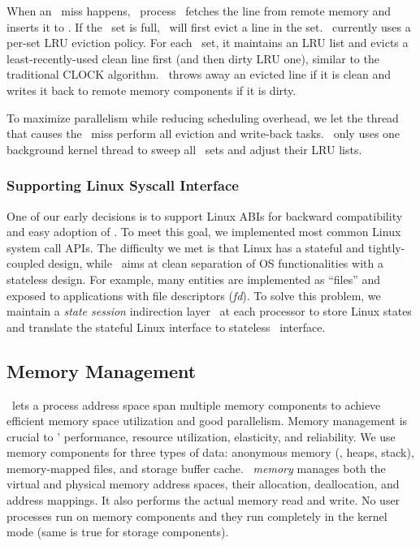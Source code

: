 \documentclass[10pt,times,twocolumn]{z2-article}
\begin{document}
{{{{{{{When an \excache\ miss happens, 
\lego\ process \microos\ fetches the line from remote memory and inserts it to \excache.
If the \excache\ set is full, \lego\ will first evict a line in the set.
\lego\ currently uses a per-set LRU eviction policy.
For each \excache\ set, it maintains an LRU list and evicts 
a least-recently-used clean line first (and then dirty LRU one),
similar to the traditional CLOCK algorithm.
\lego\ throws away an evicted line if it is clean
and writes it back to remote memory components if it is dirty.

To maximize parallelism while reducing scheduling overhead,
we let the thread that causes the \excache\ miss perform all eviction and write-back tasks.
\lego\ only uses one background kernel thread to sweep all \excache\ sets and adjust their LRU lists.

\subsubsection{Supporting Linux Syscall Interface}
One of our early decisions is to support Linux ABIs for backward compatibility
and easy adoption of \lego.
To meet this goal, we implemented most common Linux system call APIs. 
The difficulty we met is that Linux has a stateful and tightly-coupled design,
while \lego\ aims at clean separation of OS functionalities with a stateless design.
For example, many entities are implemented as ``files'' 
and exposed to applications with file descriptors ({\em fd}).
To solve this problem, we maintain a {\em state session} indirection layer~\cite{Sandberg-NFS-85}
at each processor to store Linux states and translate the stateful Linux interface to stateless \lego\ interface.


\subsection{Memory Management}
\lego\ lets a process address space span multiple memory components
to achieve efficient memory space utilization and good parallelism.
Memory management is crucial to \lego{}' performance,
resource utilization, elasticity, and reliability.
We use memory components for three types of data:
anonymous memory (\ie, heaps, stack), 
memory-mapped files, and storage buffer cache.
\lego\ {\em memory \microos{}}
manages both the virtual and physical memory address spaces,
their allocation, deallocation, and address mappings.
It also performs the actual memory read and write.
No user processes run on memory components 
and they run completely in the kernel mode
(same is true for storage components). 

}}}}}}}
\end{document}
